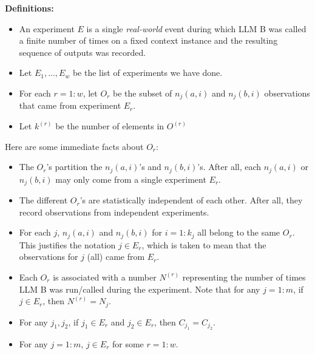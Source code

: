 \documentclass{article}
\begin{document}
\textbf{Definitions:}
\begin{itemize}
\item An experiment $\displaystyle E$ is a single \emph{real-world} event during which LLM B was called a finite number of times on a fixed context instance and the resulting sequence of outputs was recorded.
\item Let $\displaystyle E_{1} ,...,E_{w}$ be the list of experiments we have done.
\item For each $\displaystyle r=1:w$, let $\displaystyle O_{r}$ be the subset of $\displaystyle n_{j}\left( a,i\right)$ and $\displaystyle n_{j}\left( b,i\right)$ observations that came from experiment $\displaystyle E_{r}$.
\item Let $\displaystyle k^{\left( r\right)}$ be the number of elements in $\displaystyle O^{\left( r\right)}$
\end{itemize}



Here are some immediate facts about $\displaystyle O_{r}$:
\begin{itemize}
\item The $\displaystyle O_{r}$'s partition the $\displaystyle n_{j}\left( a,i\right)$'s and $\displaystyle n_{j}\left( b,i\right)$'s. After all, each $\displaystyle n_{j}\left( a,i\right)$ or $\displaystyle n_{j}\left( b,i\right)$ may only come from a single experiment $\displaystyle E_{r}$.
\item The different $\displaystyle O_{r}$'s are statistically independent of each other. After all, they record observations from independent experiments.
\item For each $\displaystyle j$, $\displaystyle n_{j}\left( a,i\right)$ and $\displaystyle n_{j}\left( b,i\right)$ for $\displaystyle i=1:k_{j}$ all belong to the same $\displaystyle O_{r}$. This justifies the notation $\displaystyle j\in E_{r}$, which is taken to mean that the observations for $\displaystyle j$ (all) came from $\displaystyle E_{r}$.
\item Each $\displaystyle O_{r}$ is associated with a number $\displaystyle N^{\left( r\right)}$ representing the number of times LLM B was run/called during the experiment. Note that for any $\displaystyle j=1:m$, if $\displaystyle j\in E_{r}$, then $\displaystyle N^{\left( r\right)} =N_{j}$.
\item For any $\displaystyle j_{1} ,j_{2}$, if $\displaystyle j_{1} \in E_{r}$ and $\displaystyle j_{2} \in E_{r}$, then $\displaystyle C_{j_{1}} =C_{j_{2}}$.
\item For any $\displaystyle j=1:m$, $\displaystyle j\in E_{r}$ for some $\displaystyle r=1:w$.
\end{itemize}
\end{document}
